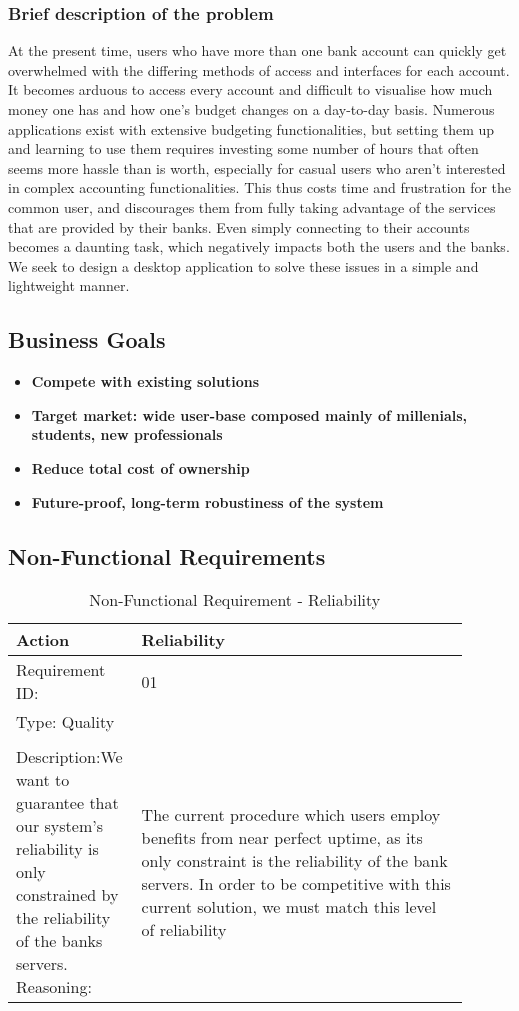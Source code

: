 \documentclass[11pt]{article}
\newcounter{use case ID}
\newcommand\addrow[2]{#1 & #2\\ \hline}
\newcounter{req ID}
\newcommand\tabularheadfsd[1]{
\begin{table}[ht]
    \addtocounter{req ID}{1}
    \caption{Non-Functional Requirement \arabic{req ID} - #1}
    \vspace{0.2cm}
    \begin{tabular}{|p{0.2\linewidth}|p{0.70\linewidth}|}
    \hline
        \textbf{Action} & \textbf{#1} \\
        \hline}
\newenvironment{requirement}{\tabularheadfsd}
{\hline\end{tabular}\end{table}}
\begin{document}
\subsubsection{Brief description of the problem}
At the present time, users who have more than one bank account can quickly get overwhelmed with the differing methods of access and interfaces for each account. It becomes arduous to access every account and difficult to visualise how much money one has and how one's budget changes on a day-to-day basis. Numerous applications exist with extensive budgeting functionalities, but setting them up and learning to use them requires investing some number of hours that often seems more hassle than is worth, especially for casual users who aren't interested in complex accounting functionalities. This thus costs time and frustration for the common user, and discourages them from fully taking advantage of the services that are provided by their banks. Even simply connecting to their accounts becomes a daunting task, which negatively impacts both the users and the banks. We seek to design a desktop application to solve these issues in a simple and lightweight manner.

\subsection{Business Goals}

\begin{itemize}
    \item \textbf{Compete with existing solutions}
    \item \textbf{Target market: wide user-base composed mainly of millenials, students, new professionals}
    \item \textbf{Reduce total cost of ownership}
    \item \textbf{Future-proof, long-term robustiness of the system}
\end{itemize}


\subsection{Non-Functional Requirements}

\begin{requirement}{Reliability}
\addrow{Requirement ID:}{01}
\addrow{Type: Quality}
\addrow{Description:}{We want to guarantee that our system's reliability is only constrained by the reliability of the banks servers.}
\addrow{Reasoning:}{The current procedure which users employ benefits from near perfect uptime, as its only constraint is the reliability of the bank servers. In order to be competitive with this current solution, we must match this level of reliability}
\end{requirement}
\end{document}
